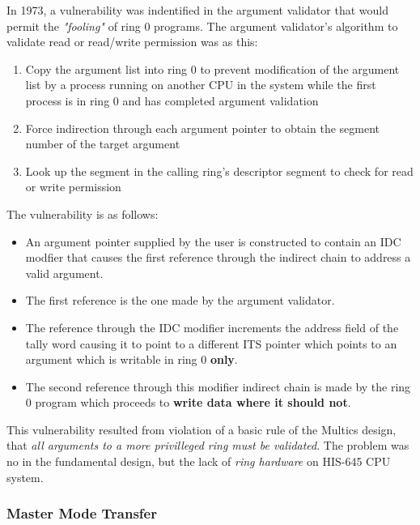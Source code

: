 In 1973, a vulnerability was indentified in the argument validator that would permit the \textit{"fooling"} of ring 0 
programs.
The argument validator's algorithm to validate read or read/write permission was as this:
\begin{enumerate}
    \item Copy the argument list into ring 0 to prevent modification of the argument list by a process 
    running on another CPU in the system while the first process is in ring 0 and has completed argument validation
    \item Force indirection through each argument pointer to obtain the segment number of the target argument
    \item Look up the segment in the calling ring's descriptor segment to check for read or write permission
\end{enumerate}

The vulnerability is as follows:
\begin{itemize}
    \item An argument pointer supplied by the user is constructed to contain an IDC modfier that causes the first 
    reference through the indirect chain to address a valid argument.
    \item The first reference is the one made by the argument validator.
    \item The reference through the IDC modifier increments the address field of the tally word causing it to point 
    to a different ITS pointer which points to an argument which is writable in ring 0 \textbf{only}.
    \item The second reference through this modifier indirect chain is made by the ring 0 program which proceeds 
    to \textbf{write data where it should not}. 
\end{itemize}

This vulnerability resulted from violation of a basic rule of the Multics design, that \textit{all arguments to a more 
privilleged ring must be validated}.
The problem was no in the fundamental design, but the lack of \textit{ring hardware} on HIS-645 CPU system.

\subsubsection{Master Mode Transfer}


